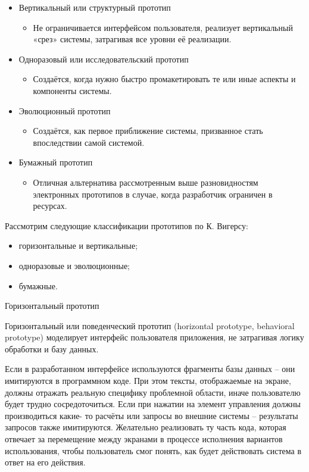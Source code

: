 \documentclass{../industrial-development}
\begin{document}
{\begin{frame}
\begin{itemize}
\item \alert{Вертикальный или структурный прототип} \begin{itemize}
\item Не ограничивается интерфейсом пользователя, реализует вертикальный «срез» системы, затрагивая все уровни её реализации.
\end{itemize}

\item \alert{Одноразовый или исследовательский прототип} 
\begin{itemize}
\item Создаётся, когда нужно быстро промакетировать те или иные аспекты и
компоненты системы.
\end{itemize}
\item \alert{Эволюционный прототип} 
\begin{itemize} 
\item Создаётся, как первое
приближение системы, призванное стать впоследствии самой системой.
\end{itemize}
\item \alert{Бумажный прототип} 
\begin{itemize}
\item Отличная альтернатива рассмотренным
выше разновидностям электронных прототипов в случае, когда разработчик ограничен в
ресурсах.
\end{itemize}
\end{itemize}
\end{frame}

\lecturenotes

Рассмотрим следующие классификации прототипов по К. Вигерсу:

\begin{itemize}
\item горизонтальные и вертикальные;
\item одноразовые и эволюционные;
\item бумажные.
\end{itemize}

\alert{Горизонтальный прототип}

Горизонтальный или поведенческий прототип (horizontal prototype, behavioral
prototype) моделирует интерфейс пользователя приложения, не затрагивая логику
обработки и базу данных.

Если в разработанном интерфейсе используются фрагменты базы данных – они
имитируются в программном коде. При этом тексты, отображаемые на экране, должны
отражать реальную специфику проблемной области, иначе пользователю будет трудно
сосредоточиться. Если при нажатии на элемент управления должны производиться какие-
то расчёты или запросы во внешние системы – результаты запросов также имитируются.
Желательно реализовать ту часть кода, которая отвечает за перемещение между экранами
в процессе исполнения вариантов использования, чтобы пользователь смог понять, как
будет действовать система в ответ на его действия.

}
\end{document}
